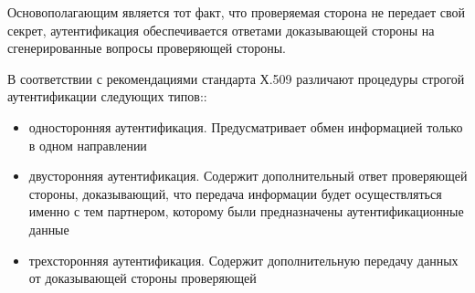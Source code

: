 Основополагающим является тот факт, что проверяемая сторона не передает свой секрет, аутентификация
обеспечивается ответами доказывающей стороны на сгенерированные вопросы проверяющей стороны.

В соответствии с рекомендациями стандарта Х.509 различают процедуры строгой аутентификации
следующих типов\cite{crypto-methods}::
\begin{itemize}
    \item односторонняя аутентификация. Предусматривает обмен информацией только в одном направлении
    \item двусторонняя аутентификация. Содержит дополнительный ответ проверяющей стороны,
        доказывающий, что передача информации будет осуществляться именно с тем партнером, которому
        были предназначены аутентификационные данные
    \item трехсторонняя аутентификация. Содержит дополнительную передачу данных от доказывающей
        стороны проверяющей
\end{itemize}


